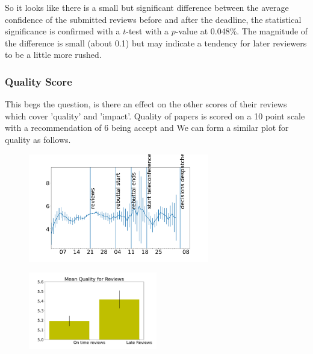 So it looks like there is a small but significant difference between the
average confidence of the submitted reviews before and after the
deadline, the statistical significance is confirmed with a \(t\)-test
with a \(p\)-value at 0.048\%. The magnitude of the difference is small
(about 0.1) but may indicate a tendency for later reviewers to be a
little more rushed.

\hypertarget{quality-score}{%
\subsubsection{Quality Score}\label{quality-score}}

This begs the question, is there an effect on the other scores of their
reviews which cover 'quality' and 'impact'. Quality of papers is scored
on a 10 point scale with a recommendation of 6 being accept and We can
form a similar plot for quality as follows.

\begin{figure}[htb]
\includegraphics[width=0.70\textwidth]{diagrams/neurips/review-quality-time.pdf}


\caption{}
\label{review-quality-time}
\end{figure}

\begin{figure}[htb]
\includegraphics[width=0.50\textwidth]{diagrams/neurips/review-quality-early-late.pdf}


\caption{}
\label{review-quality-early-late}
\end{figure}

